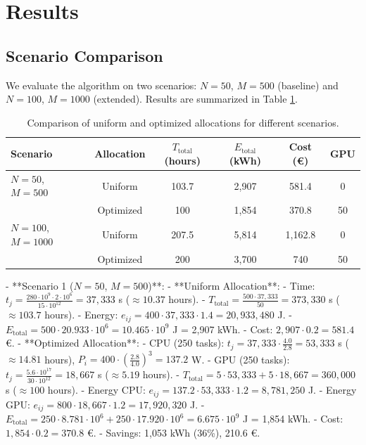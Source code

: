 \documentclass[a4paper,11pt]{article}
\begin{document}
\section{Results}

\subsection{Scenario Comparison}
We evaluate the algorithm on two scenarios: $N=50$, $M=500$ (baseline) and $N=100$, $M=1000$ (extended). Results are summarized in Table \ref{tab:results}.

\begin{table}[htbp]
    \centering
    \caption{Comparison of uniform and optimized allocations for different scenarios.}
    \label{tab:results}
    \begin{tabular}{lccccc}
        \toprule
        \textbf{Scenario} & \textbf{Allocation} & \textbf{$T_{\text{total}}$ (hours)} & \textbf{$E_{\text{total}}$ (kWh)} & \textbf{Cost (€)} & \textbf{GPU} \\
        \midrule
        $N=50$, $M=500$ & Uniform & 103.7 & 2,907 & 581.4 & 0 \\
        & Optimized & 100 & 1,854 & 370.8 & 50 \\
        \midrule
        $N=100$, $M=1000$ & Uniform & 207.5 & 5,814 & 1,162.8 & 0 \\
        & Optimized & 200 & 3,700 & 740 & 50 \\
        \bottomrule
    \end{tabular}
\end{table}

- **Scenario 1 ($N=50$, $M=500$)**:
  - **Uniform Allocation**:
    - Time: $t_j = \frac{280 \cdot 10^9 \cdot 2 \cdot 10^6}{15 \cdot 10^{12}} = 37,333$ s ($\approx 10.37$ hours).
    - $T_{\text{total}} = \frac{500 \cdot 37,333}{50} = 373,330$ s ($\approx 103.7$ hours).
    - Energy: $e_{ij} = 400 \cdot 37,333 \cdot 1.4 = 20,933,480$ J.
    - $E_{\text{total}} = 500 \cdot 20.933 \cdot 10^6 = 10.465 \cdot 10^9$ J = 2,907 kWh.
    - Cost: $2,907 \cdot 0.2 = 581.4$ €.
  - **Optimized Allocation**:
    - CPU (250 tasks): $t_j = 37,333 \cdot \frac{4.0}{2.8} = 53,333$ s ($\approx 14.81$ hours), $P_i = 400 \cdot \left( \frac{2.8}{4.0} \right)^3 = 137.2$ W.
    - GPU (250 tasks): $t_j = \frac{5.6 \cdot 10^{17}}{30 \cdot 10^{12}} = 18,667$ s ($\approx 5.19$ hours).
    - $T_{\text{total}} = 5 \cdot 53,333 + 5 \cdot 18,667 = 360,000$ s ($\approx 100$ hours).
    - Energy CPU: $e_{ij} = 137.2 \cdot 53,333 \cdot 1.2 = 8,781,250$ J.
    - Energy GPU: $e_{ij} = 800 \cdot 18,667 \cdot 1.2 = 17,920,320$ J.
    - $E_{\text{total}} = 250 \cdot 8.781 \cdot 10^6 + 250 \cdot 17.920 \cdot 10^6 = 6.675 \cdot 10^9$ J = 1,854 kWh.
    - Cost: $1,854 \cdot 0.2 = 370.8$ €.
    - Savings: 1,053 kWh (36\%), 210.6 €.
\end{document}
